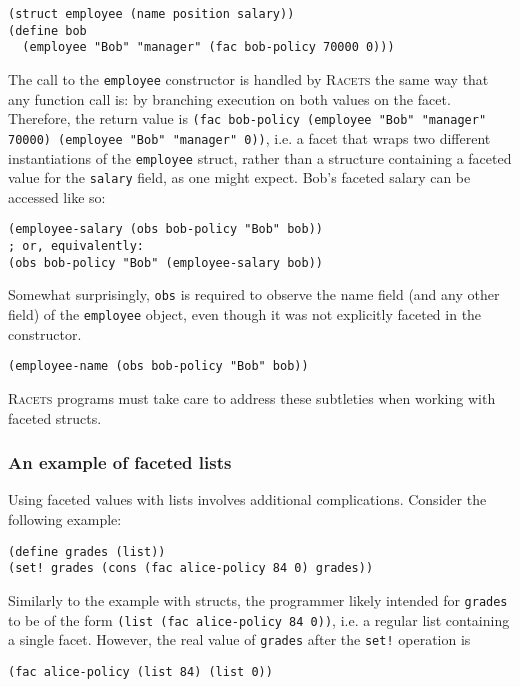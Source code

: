 \documentclass{article}
\begin{document}
\begin{lstlisting}
(struct employee (name position salary))
(define bob
  (employee "Bob" "manager" (fac bob-policy 70000 0)))
\end{lstlisting}

The call to the \texttt{employee} constructor is handled by \textsc{Racets} the same way that any function call is: by branching execution on both values on the facet. Therefore, the return value is \texttt{(fac bob-policy (employee "Bob" "manager" 70000) (employee "Bob" "manager" 0))}, i.e. a facet that wraps two different instantiations of the \texttt{employee} struct, rather than a structure containing a faceted value for the \texttt{salary} field, as one might expect. Bob's faceted salary can be accessed like so:

\begin{lstlisting}
(employee-salary (obs bob-policy "Bob" bob))
; or, equivalently:
(obs bob-policy "Bob" (employee-salary bob))
\end{lstlisting}

Somewhat surprisingly, \texttt{obs} is required to observe the name field (and any other field) of the \texttt{employee} object, even though it was not explicitly faceted in the constructor.

\begin{lstlisting}
(employee-name (obs bob-policy "Bob" bob))
\end{lstlisting}

\textsc{Racets} programs must take care to address these subtleties when working with faceted structs.


\subsubsection{An example of faceted lists}
Using faceted values with lists involves additional complications. Consider the following example:

\begin{lstlisting}
(define grades (list))
(set! grades (cons (fac alice-policy 84 0) grades))
\end{lstlisting}

Similarly to the example with structs, the programmer likely intended for \texttt{grades} to be of the form \texttt{(list (fac alice-policy 84 0))}, i.e. a regular list containing a single facet. However, the real value of \texttt{grades} after the \texttt{set!} operation is

\begin{lstlisting}
(fac alice-policy (list 84) (list 0))
\end{lstlisting}
\end{document}
